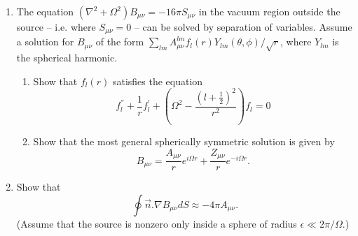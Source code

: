 \documentclass{article}
\begin{document}
\begin{enumerate}
\item The equation $(\nabla^2  + \Omega^2)B_{\mu\nu} = -16\pi S_{\mu\nu}$ in the vacuum region outside the source – i.e. where $S_{\mu\nu} = 0$ – can be solved by separation of variables. Assume a solution for ${B}_{\mu\nu}$ of the form $\sum_{lm} A^{lm}_{\mu\nu}f_l(r)Y_{lm}(\theta , \phi)/\sqrt{r}$, where $Y_{lm}$ is the spherical harmonic.
  \begin{enumerate}
  \item Show that $f_l(r)$ satisfies the equation
    \begin{equation}
      \label{eq:fl}
      f_l^{''} + \frac{1}{r}f_l^{'} + (\Omega^2 - \frac{(l + \frac{1}{2})^2}{r^2})f_l = 0
    \end{equation}
  \item Show that the most general spherically symmetric solution is given by
    \begin{equation}
      \label{eq:general-sol}
      B_{\mu\nu} = \frac{A_{\mu\nu}}{r}e^{i\Omega r} + \frac{Z_{\mu\nu}}{r}e^{-i\Omega r}.
    \end{equation}
  \end{enumerate}
\item Show that
  \begin{equation}
    \label{eq:integral-B}
    \oint \vec{n}.\nabla B_{\mu\nu} dS \approx -4\pi A_{\mu\nu}. 
  \end{equation}
  (Assume that the source is nonzero only inside a sphere of radius $\epsilon \ll 2\pi/\Omega$.)
\end{enumerate}
\end{document}
